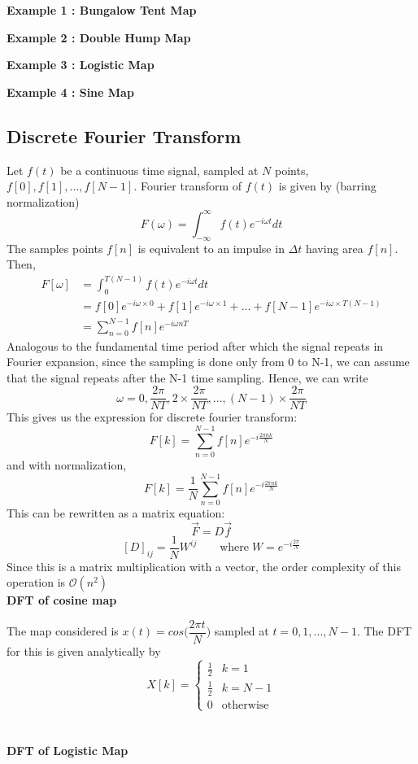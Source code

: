 \documentclass[11pt]{article}
\begin{document}
            \textbf{Example 1 : Bungalow Tent Map}

            \textbf{Example 2 : Double Hump Map}

            \textbf{Example 3 : Logistic Map}

            \textbf{Example 4 : Sine Map}


   		\subsection{Discrete Fourier Transform}
   			Let $f(t)$ be a continuous time signal, sampled at $N$ points, $f[0],f[1],...,f[N-1]$. Fourier transform of $f(t)$ is given by (barring normalization)
   			$$
   				F(\omega)=\int_{-\infty}^\infty f(t) e^{-i \omega t} dt
   			$$
   			The samples points $f[n]$ is equivalent to an impulse in $\Delta t$ having area $f[n]$. Then,
   			\begin{align*}
   				F[\omega] &= \int_0^{T (N-1)} f(t) e^{- i \omega t}dt  \\
   				&= f[0] e^{-i \omega \times 0} + f[1] e^{-i \omega \times 1} +...+ f[N-1] e^{-i \omega \times T(N-1)} \\
   				&= \sum_{n=0}^{N-1} f[n] e^{- i \omega n T}
   			\end{align*}
   			Analogous to the fundamental time period after which the signal repeats in Fourier expansion, since the sampling is done only from 0 to N-1, we can assume that the signal repeats after the N-1 time sampling. Hence, we can write
   			$$
   				\omega = 0, \frac{2\pi}{N T},2 \times \frac{2\pi}{N T},...,(N-1) \times \frac{2\pi}{N T}
   			$$
   			This gives us the expression for discrete fourier transform:
   			$$
   				F[k] = \sum_{n=0}^{N-1} f[n] e^{-i\frac{ 2\pi n k }{N}}
   			$$
   			and with normalization, 
   			$$
   				F[k] = \frac{1}{N}\sum_{n=0}^{N-1} f[n] e^{-i\frac{ 2\pi n k }{N}}
   			$$
   			This can be rewritten as a matrix equation:
   			$$
   				\vec F = D \vec f
   			$$
   			$$
   				[D]_{ij} = \frac{1}{N} W^{ij} \qquad \textrm{where} \; W = e^{-i\frac{2\pi}{N}}
   			$$
   			Since this is a matrix multiplication with a vector, the order complexity of this operation is $\mathcal{O} (n^2)$ \\[10mm]
            \textbf{DFT of cosine map}

            The map considered is $x(t) = cos\Big(\dfrac{2 \pi t}{N}\Big)$ sampled at $t=0,1,...,N-1$. The DFT for this is given analytically by 
            $$
               X[k] = 
               \begin{cases} 
                  \frac{1}{2} & k = 1\\
                  \frac{1}{2} & k = N-1\\
                  0 &\textrm{otherwise}
                  \end{cases}
            $$\\ \\
            \textbf{DFT of Logistic Map}
\end{document}
